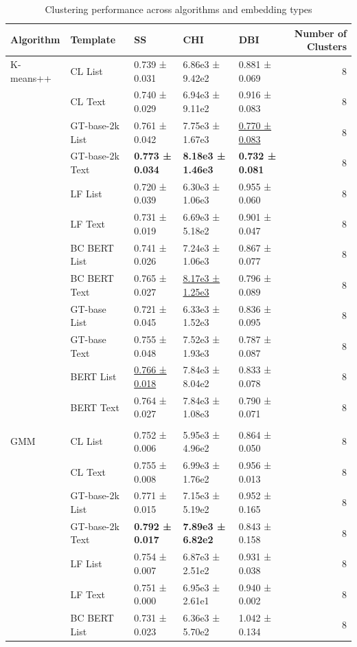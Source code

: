 \begin{table}[!h]
\centering
\caption{Clustering performance across algorithms and embedding types}
\centering
\begin{tabular}[t]{lllllr}
\toprule
Algorithm & Template & SS & CHI & DBI & Number of Clusters\\
\midrule
K-means++ & CL List & 0.739 ± 0.031 & 6.86e3 ± 9.42e2 & 0.881 ± 0.069 & 8\\
 & CL Text & 0.740 ± 0.029 & 6.94e3 ± 9.11e2 & 0.916 ± 0.083 & 8\\
 & GT-base-2k List & 0.761 ± 0.042 & 7.75e3 ± 1.67e3 & \underline{0.770 ± 0.083} & 8\\
 & GT-base-2k Text & \textbf{0.773 ± 0.034} & \textbf{8.18e3 ± 1.46e3} & \textbf{0.732 ± 0.081} & 8\\
 & LF List & 0.720 ± 0.039 & 6.30e3 ± 1.06e3 & 0.955 ± 0.060 & 8\\
\addlinespace
 & LF Text & 0.731 ± 0.019 & 6.69e3 ± 5.18e2 & 0.901 ± 0.047 & 8\\
 & BC BERT List & 0.741 ± 0.026 & 7.24e3 ± 1.06e3 & 0.867 ± 0.077 & 8\\
 & BC BERT Text & 0.765 ± 0.027 & \underline{8.17e3 ± 1.25e3} & 0.796 ± 0.089 & 8\\
 & GT-base List & 0.721 ± 0.045 & 6.33e3 ± 1.52e3 & 0.836 ± 0.095 & 8\\
 & GT-base Text & 0.755 ± 0.048 & 7.52e3 ± 1.93e3 & 0.787 ± 0.087 & 8\\
\addlinespace
 & BERT List & \underline{0.766 ± 0.018} & 7.84e3 ± 8.04e2 & 0.833 ± 0.078 & 8\\
 & BERT Text & 0.764 ± 0.027 & 7.84e3 ± 1.08e3 & 0.790 ± 0.071 & 8\\
\midrule\\
GMM & CL List & 0.752 ± 0.006 & 5.95e3 ± 4.96e2 & 0.864 ± 0.050 & 8\\
 & CL Text & 0.755 ± 0.008 & 6.99e3 ± 1.76e2 & 0.956 ± 0.013 & 8\\
 & GT-base-2k List & 0.771 ± 0.015 & 7.15e3 ± 5.19e2 & 0.952 ± 0.165 & 8\\
\addlinespace
 & GT-base-2k Text & \textbf{0.792 ± 0.017} & \textbf{7.89e3 ± 6.82e2} & 0.843 ± 0.158 & 8\\
 & LF List & 0.754 ± 0.007 & 6.87e3 ± 2.51e2 & 0.931 ± 0.038 & 8\\
 & LF Text & 0.751 ± 0.000 & 6.95e3 ± 2.61e1 & 0.940 ± 0.002 & 8\\
 & BC BERT List & 0.731 ± 0.023 & 6.36e3 ± 5.70e2 & 1.042 ± 0.134 & 8\\

\end{tabular}
\end{table}
